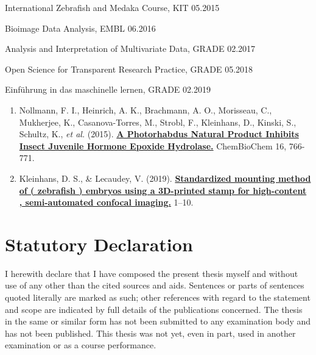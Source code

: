 \documentclass[10pt, b5paper, singlespacinge, twoside]{reedthesis} %
\providecommand{\tightlist}{%
  \setlength{\itemsep}{0pt}\setlength{\parskip}{0pt}}
\theoremstyle{definition}
\theoremstyle{definition}
\theoremstyle{definition}
\theoremstyle{remark}
\begin{document}
\vspace{0.3cm}

 \hrulefill
\vspace{0.2cm}

\noindent International Zebrafish and Medaka Course, KIT \hfill 05.2015

\noindent Bioimage Data Analysis, EMBL \hfill 06.2016

\noindent Analysis and Interpretation of Multivariate Data, GRADE \hfill 02.2017

\noindent Open Science for Transparent Research Practice, GRADE \hfill 05.2018

\noindent Einführung in das maschinelle lernen, GRADE \hfill 02.2019

\vspace{0.3cm}

 \hrulefill
\begin{enumerate}
\def\labelenumi{\arabic{enumi}.}
\tightlist
\item
  Nollmann, F. I., Heinrich, A. K., Brachmann, A. O., Morisseau, C., Mukherjee, K., Casanova-Torres, M., Strobl, F., Kleinhans, D., Kinski, S., Schultz, K., \emph{et al.} (2015). \href{https://onlinelibrary.wiley.com/doi/abs/10.1002/cbic.201402650}{\textbf{A Photorhabdus Natural Product Inhibits Insect Juvenile Hormone Epoxide Hydrolase.}} ChemBioChem 16, 766-771.
\item
  Kleinhans, D. S., \& Lecaudey, V. (2019). \href{https://bmcbiotechnol.biomedcentral.com/track/pdf/10.1186/s12896-019-0558-y}{\textbf{Standardized mounting method of ( zebrafish ) embryos using a 3D-printed stamp for high-content , semi-automated confocal imaging.}} 1--10.
\end{enumerate}
\hypertarget{statutory-declaration}{%
\chapter*{\texorpdfstring{\textbf{Statutory Declaration}}{Statutory Declaration}}\label{statutory-declaration}}

I herewith declare that I have composed the present thesis myself and without use of any other than the
cited sources and aids. Sentences or parts of sentences quoted literally are marked as such; other references
with regard to the statement and scope are indicated by full details of the publications concerned. The thesis
in the same or similar form has not been submitted to any examination body and has not been published.
This thesis was not yet, even in part, used in another examination or as a course performance.
\end{document}
